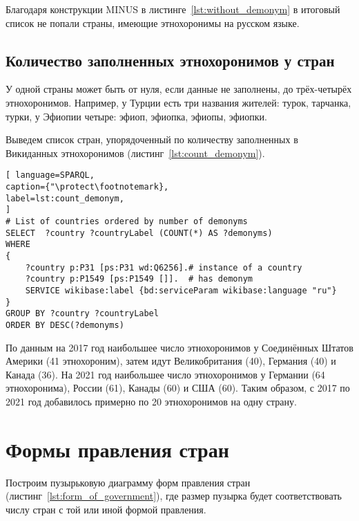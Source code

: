 
Благодаря конструкции MINUS в листинге~\ref{lst:without_demonym}  в итоговый список не попали страны, имеющие этнохоронимы на русском языке. 

\subsection{Количество заполненных этнохоронимов у стран}

У одной страны может быть от нуля, если данные не заполнены, до трёх-четырёх этнохоронимов. Например, у Турции есть три названия жителей: турок, тарчанка, турки, у Эфиопии четыре: эфиоп, эфиопка, эфиопы, эфиопки.

Выведем список стран, упорядоченный по количеству заполненных в Викиданных этнохоронимов (листинг~\ref{lst:count_demonym}).

\begin{lstlisting}[ language=SPARQL, 
caption={"\protect\footnotemark},
label=lst:count_demonym, 
]
# List of countries ordered by number of demonyms
SELECT  ?country ?countryLabel (COUNT(*) AS ?demonyms)
WHERE
{
	?country p:P31 [ps:P31 wd:Q6256].# instance of a country
	?country p:P1549 [ps:P1549 []].  # has demonym
	SERVICE wikibase:label {bd:serviceParam wikibase:language "ru"}
}
GROUP BY ?country ?countryLabel 
ORDER BY DESC(?demonyms)
\end{lstlisting}


По данным на 2017 год наибольшее число этнохоронимов у Соединённых Штатов Америки (41 этнохороним), затем идут Великобритания (40), Германия (40) и Канада (36). На 2021 год наибольшее число этнохоронимов у Германии (64 этнохоронима), России (61), Канады (60) и США (60). Таким образом, с 2017 по 2021 год добавилось примерно по 20 этнохоронимов на одну страну.


\section{Формы правления стран}

Построим пузырьковую диаграмму форм правления стран (листинг~\ref{lst:form_of_government}), где размер пузырка будет соответствовать числу стран с той или иной формой правления.


